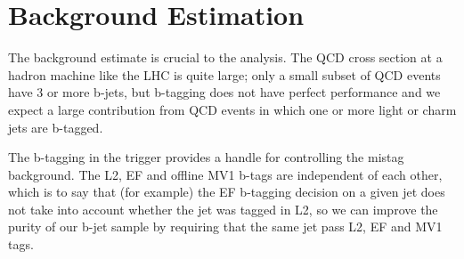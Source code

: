  

\chapter[Background Estimation]{Background Estimation}

The background estimate is crucial to the analysis.  The QCD cross section at a hadron machine like the LHC is quite large; only a small subset of QCD events have 3 or more b-jets, but b-tagging does not have perfect performance and we expect a large contribution from QCD events in which one or more light or charm jets are b-tagged.

The b-tagging in the trigger provides a handle for controlling the mistag background.  The L2, EF and offline MV1 b-tags are independent of each other, which is to say that (for example) the EF b-tagging decision on a given jet does not take into account whether the jet was tagged in L2, so we can improve the purity of our b-jet sample by requiring that the same jet pass L2, EF and MV1 tags.  


